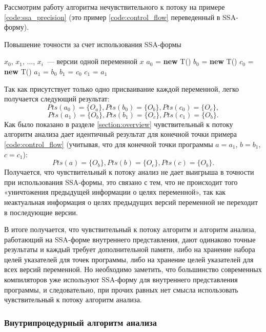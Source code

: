 \documentclass[14pt,titlepage]{extarticle}
\newcommand{\NEW}{\textbf{new }}
\newenvironment{fresh}{\color{Blue}}{\color{black}}
\begin{document}
\begin{fresh}
      Рассмотрим работу алгоритма нечувствительного к потоку на
      примере \ref{code:ssa_precision}
      (это пример \ref{code:control_flow} переведенный в SSA-форму).
      \begin{algorithm}
        \caption{Повышение точности за счет использования SSA-формы}
        \label{code:ssa_precision}
        \begin{algorithmic}[1]
          \REQUIRE $x_0$, $x_1$, ..., $x_i$~--- версии одной переменной $x$
          \STATE $a_0$ = \NEW T()
          \STATE $b_0$ = \NEW T()
          \STATE $c_0$ = \NEW T()
          \STATE $a_1$ = $b_0$
          \STATE $b_1$ = $c_0$
          \STATE $c_1$ = $a_1$
        \end{algorithmic}
      \end{algorithm}
      Так как присутствует только одно присваивание каждой переменной, легко
      получается следующий результат:
      \[Pts(a_0) = \{O_a\}, Pts(b_0) = \{O_b\}, Pts(c_0) = \{O_c\},\]
      \[Pts(a_1) = \{O_b\}, Pts(b_1) = \{O_c\}, Pts(c_1) = \{O_b\}.\]
      Как было показано в разделе \ref{section:overview} чувствительный к
      потоку алгоритм анализа дает идентичный результат для конечной точки
      примера \ref{code:control_flow} (учитывая, что для конечной точки
      программы $a = a_1$, $b = b_1$, $c = c_1$):
      \[Pts(a) = \{O_b\}, Pts(b) = \{O_c\}, Pts(c) = \{O_b\}.\]
      Получается, что чувствительный к потоку анализ не дает выигрыша в
      точности при использования SSA-формы, это связано с тем, что не
      происходит того «уничтожения предыдущей информации о целях переменной»,
      так как неактуальная информация о целях предыдущих версий переменной не
      переходит в последующие версии.

      В итоге получается, что чувствительный к потоку алгоритм и алгоритм
      анализа, работающий на SSA-форме внутреннего представления, дают
      одинаково точные результаты и каждый требует дополнительной памяти, либо
      на хранение набора целей указателей для точек программы, либо на хранение
      целей указателей для всех версий переменной. Но необходимо заметить, что
      большинство современных компиляторов уже используют SSA-форму для
      внутреннего представления программы, и следовательно, при прочих равных
      нет смысла использовать чувствительный к потоку алгоритм анализа.

    \subsubsection{Внутрипроцедурный алгоритм анализа}


\end{fresh}
\end{document}
